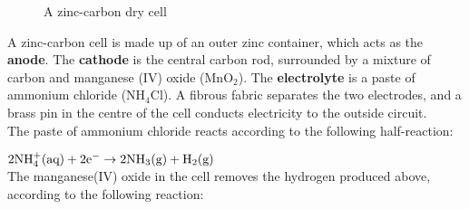 \begin{center}
\begin{figure}[h]
\caption{A zinc-carbon dry cell}
\label{fig:chemindustry:zinc-carbon}
\end{figure}
\end{center}


A zinc-carbon cell is made up of an outer zinc container, which acts as the \textbf{anode}. The \textbf{cathode} is the central carbon rod, surrounded by a mixture of carbon and manganese (IV) oxide (MnO$_{2}$). The \textbf{electrolyte} is a paste of ammonium chloride (NH$_{4}$Cl). A fibrous fabric separates the two electrodes, and a brass pin in the centre of the cell conducts electricity to the outside circuit. \\

The paste of ammonium chloride reacts according to the following half-reaction:

$\rm{2NH_{4}^{+}(aq) + 2e^{-} \rightarrow 2NH_{3}(g) + H_{2}(g)}$\\

The manganese(IV) oxide in the cell removes the hydrogen produced above, according to the following reaction:

